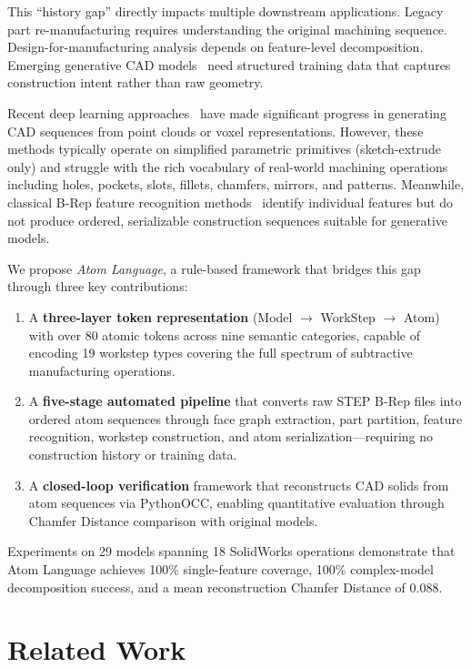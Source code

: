 \documentclass{styles/svproc}
\begin{document}
This ``history gap'' directly impacts multiple downstream applications. Legacy part re-manufacturing requires understanding the original machining sequence. Design-for-manufacturing analysis depends on feature-level decomposition. Emerging generative CAD models~\cite{wu2021deepcad} need structured training data that captures construction intent rather than raw geometry.

Recent deep learning approaches~\cite{wu2021deepcad,willis2021fusion360,you2022point2sequence} have made significant progress in generating CAD sequences from point clouds or voxel representations. However, these methods typically operate on simplified parametric primitives (sketch-extrude only) and struggle with the rich vocabulary of real-world machining operations including holes, pockets, slots, fillets, chamfers, mirrors, and patterns. Meanwhile, classical B-Rep feature recognition methods~\cite{mukherjee2001brep,shi2020brep} identify individual features but do not produce ordered, serializable construction sequences suitable for generative models.

We propose \emph{Atom Language}, a rule-based framework that bridges this gap through three key contributions:

\begin{enumerate}
\item A \textbf{three-layer token representation} (Model $\to$ WorkStep $\to$ Atom) with over 80 atomic tokens across nine semantic categories, capable of encoding 19 workstep types covering the full spectrum of subtractive manufacturing operations.
\item A \textbf{five-stage automated pipeline} that converts raw STEP B-Rep files into ordered atom sequences through face graph extraction, part partition, feature recognition, workstep construction, and atom serialization---requiring no construction history or training data.
\item A \textbf{closed-loop verification} framework that reconstructs CAD solids from atom sequences via PythonOCC, enabling quantitative evaluation through Chamfer Distance comparison with original models.
\end{enumerate}

Experiments on 29 models spanning 18 SolidWorks operations demonstrate that Atom Language achieves 100\% single-feature coverage, 100\% complex-model decomposition success, and a mean reconstruction Chamfer Distance of 0.088.

\section{Related Work}
\label{sec:related}
\end{document}
